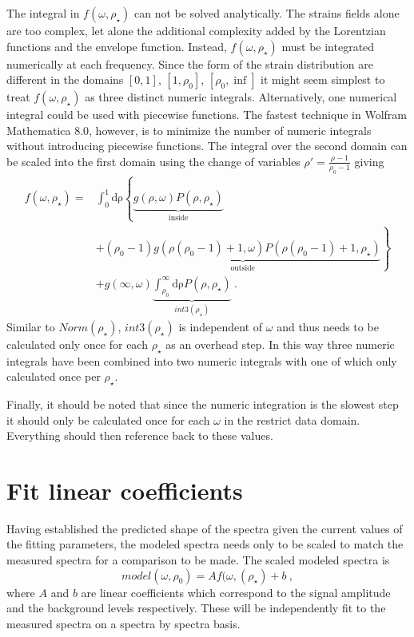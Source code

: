 The integral in $f(\omega,\rho_{\star})$ can not be solved analytically.
The strains fields alone are too complex, let alone the additional complexity added by the Lorentzian functions and the envelope function.
Instead, $f(\omega,\rho_{\star})$ must be integrated numerically at each frequency.
Since the form of the strain distribution are different in the domains $[0,1]$, $[1,\rho_0]$, $[\rho_0,\inf]$ it might seem simplest to treat $f(\omega,\rho_{\star})$ as three distinct numeric integrals.
Alternatively, one numerical integral could be used with piecewise functions.
The fastest technique in Wolfram Mathematica 8.0, however, is to minimize the number of numeric integrals without introducing piecewise functions.
The integral over the second domain can be scaled into the first domain using the change of variables $\rho'=\frac{\rho-1}{\rho_0-1}$ giving 
\begin{align*}
	f(\omega,\rho_{\star})=&\int_0^1 \mathrm{d\rho} \left \{ 
	\underbrace{g(\rho,\omega) P(\rho,\rho_{\star})}_{\textrm{inside}} \right. \\ 
	&\left. +\underbrace{(\rho_0-1) g(\rho(\rho_0-1)+1,\omega) P(\rho(\rho_0-1)+1,\rho_{\star})}_{\textrm{outside}}
	\right \} \\
	&+g(\infty,\omega) \underbrace{\int_{\rho_0}^{\infty} \mathrm{d\rho} P(\rho,\rho_{\star})}_{int3(\rho_{\star})} \ .
\end{align*}
Similar to $Norm(\rho_{\star})$, $int3(\rho_{\star})$ is independent of $\omega$ and thus needs to be calculated only once for each $\rho_{\star}$ as an overhead step.
In this way three numeric integrals have been combined into two numeric integrals with one of which only calculated once per $\rho_{\star}$.

Finally, it should be noted that since the numeric integration is the slowest step it should only be calculated once for each $\omega$ in the restrict data domain.
Everything should then reference back to these values.


\section*{Fit linear coefficients}
Having established the predicted shape of the spectra given the current values of the fitting parameters, the modeled spectra needs only to be scaled to match the measured spectra for a comparison to be made.
The scaled modeled spectra is
\begin{equation*}
	model(\omega,\rho_0)=A f(\omega,(\rho_{\star}) + b \ ,
\end{equation*}
where $A$ and $b$ are linear coefficients which correspond to the signal amplitude and the background levels respectively.
These will be independently fit to the measured spectra on a spectra by spectra basis.

